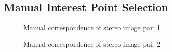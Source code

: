 \documentclass{article}
\begin{document}
\newpage
\subsection{Manual Interest Point Selection}
\begin{figure}[!htbp]
     \centering
     \captionsetup[subfigure]{labelformat=empty}
    \caption{Manual correspondence of stereo image pair 1}
    \label{fig:orig_corr_1}
\end{figure}
\begin{figure}[!htbp]
     \centering
     \captionsetup[subfigure]{labelformat=empty}
    \caption{Manual correspondence of stereo image pair 2}
    \label{fig:orig_corr_2}
\end{figure}

\newpage
\end{document}
